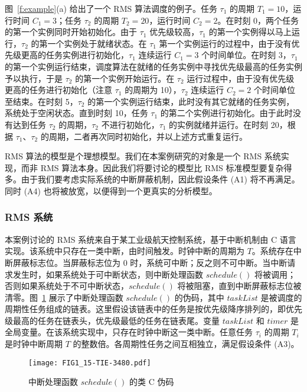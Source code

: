 图~\ref{f:example}(a) 给出了一个 RMS 算法调度的例子。任务 $\tau_1$ 的周期 $T_1=10$，运行时间 $C_1=3$；任务 $\tau_2$ 的周期 $T_2=20$，运行时间 $C_2=2$。在时刻 0，两个任务的第一个实例同时开始初始化。由于 $\tau_1$ 优先级较高，$\tau_1$ 的第一个实例得以马上运行，$\tau_2$ 的第一个实例处于就绪状态。在 $\tau_1$ 第一个实例运行的过程中，由于没有优先级更高的任务实例进行初始化，$\tau_1$ 连续运行 $C_1=3$ 个时间单位。在时刻 3，$\tau_1$ 的第一个实例运行结束，调度算法在就绪的任务实例中寻找优先级最高的任务实例予以执行，于是 $\tau_2$ 的第一个实例开始运行。在 $\tau_2$ 运行过程中，由于没有优先级更高的任务进行初始化（注意 $\tau_1$ 的周期为 10），$\tau_2$ 连续运行 $C_2=2$ 个时间单位至结束。在时刻 5，$\tau_2$ 的第一个实例运行结束，此时没有其它就绪的任务实例，系统处于空闲状态。直到时刻 10，任务 $\tau_1$ 的第二个实例进行初始化。由于此时没有达到任务 $\tau_2$ 的周期，$\tau_2$ 不进行初始化，$\tau_1$ 的实例就绪并运行。在时刻 20，根据 $\tau_1$、$\tau_2$ 的周期，二者再次同时初始化，并以上述方式重复运行。 


RMS 算法的模型是个理想模型。我们在本案例研究的对象是一个 RMS 系统实现，而非 RMS 算法本身。因此我们将要讨论的模型比 RMS 标准模型要复杂得多。由于我们要考虑实际系统的中断屏蔽机制，因此假设条件 (A1) 将不再满足。同时 (A4) 也将被放宽，以便得到一个更真实的分析模型。

\subsubsection{RMS 系统} 
\label{s:imp}

本案例讨论的 RMS 系统来自于某工业级航天控制系统，基于中断机制由 C 语言实现。该系统中只存在一类中断，由时间触发。时钟中断的周期为 $T$。系统存在中断屏蔽标志位。当屏蔽标志位为 0 时，系统可中断；反之则不可中断。当中断请求发生时，如果系统处于可中断状态，则中断处理函数 $\mathit{schedule()}$ 将被调用；否则如果系统处于不可中断状态，$\mathit{schedule()}$ 将被阻塞，直到中断屏蔽标志位被清零。图~\ref{f:schedule} 展示了中断处理函数 $\mathit{schedule()}$ 的伪码，其中 $\mathit{taskList}$ 是被调度的周期性任务组成的链表。这里假设该链表中的任务是按优先级降序排列的，即优先级最高的任务在链表头，优先级最低的任务在链表尾。变量 $\mathit{taskList}$ 和 $\mathit{timer}$ 是全局变量。在该系统实现中，只存在时钟中断这一类中断。任意任务 $\tau_i$ 的周期 $T_i$ 是时钟中断周期 $T$ 的整数倍。各周期性任务之间互相独立，满足假设条件 (A3)。
 
\begin{figure}[ht]
\centering
\texttt{[image: FIG1\_15-TIE-3480.pdf]}
\caption{中断处理函数 $\mathit{schedule()}$ 的类 C 伪码}
\label{f:schedule}
\end{figure}


